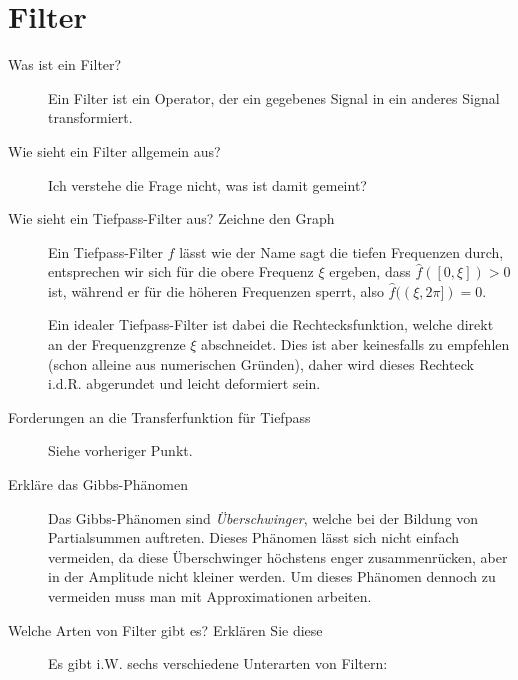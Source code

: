 \section{Filter}
\begin{description}
	\item[Was ist ein Filter?]
      Ein Filter ist ein Operator, der ein gegebenes Signal in ein anderes Signal transformiert.
	\item[Wie sieht ein Filter allgemein aus?]
    	Ich verstehe die Frage nicht, was ist damit gemeint?
	\item[Wie sieht ein Tiefpass-Filter aus? Zeichne den Graph]
      Ein Tiefpass-Filter $f$ lässt wie der Name sagt die tiefen Frequenzen durch, entsprechen wir sich für die 
      obere Frequenz $\xi$ ergeben, dass $\hat f([0,\xi])>0$ ist, während er für die höheren Frequenzen sperrt, also
      $\hat f((\xi,2\pi]) = 0$.

      Ein idealer Tiefpass-Filter ist dabei die Rechtecksfunktion, welche direkt an der Frequenzgrenze $\xi$
      abschneidet. Dies ist aber keinesfalls zu empfehlen (schon alleine aus numerischen Gründen), daher wird 
      dieses Rechteck i.d.R. abgerundet und leicht deformiert sein.
	\item[Forderungen an die Transferfunktion für Tiefpass]
      Siehe vorheriger Punkt.
	\item[Erkläre das Gibbs-Phänomen]
      Das Gibbs-Phänomen sind \emph{Überschwinger}, welche bei der Bildung von Partialsummen auftreten. Dieses
      Phänomen lässt sich nicht einfach vermeiden, da diese Überschwinger höchstens enger zusammenrücken, aber 
      in der Amplitude nicht kleiner werden. Um dieses Phänomen dennoch zu vermeiden muss man mit Approximationen 
      arbeiten.
	\item[Welche Arten von Filter gibt es? Erklären Sie diese]
      Es gibt i.W. sechs verschiedene Unterarten von Filtern:


\end{description}
